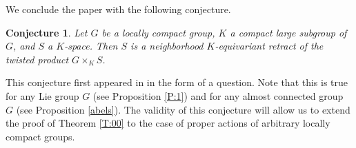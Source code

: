 \documentclass{amsart}
\newtheorem{conjecture}[theorem]{Conjecture}
\begin{document}
\medskip
  
  
  We conclude the paper with the following conjecture.
  
  \begin{conjecture}Let $G$ be a locally compact  group, $K$ a compact large  subgroup of $G$, and $S$  a $K$-space. Then $S$ is a neighborhood $K$-equivariant retract of the twisted product $G\times_K S$.  
    \end{conjecture}
    
    This conjecture first appeared in \cite[Question 4.4]{ant:proper} in the  form of a question. 
    Note that this is true for any Lie group $G$ (see Proposition \ref{P:1})  and for any  almost connected group $G$ (see Proposition \ref{abels}).
    The validity of this conjecture will allow us to extend the proof of Theorem \ref{T:00} to the case of proper actions of arbitrary locally compact groups. 
      
\end{document}
